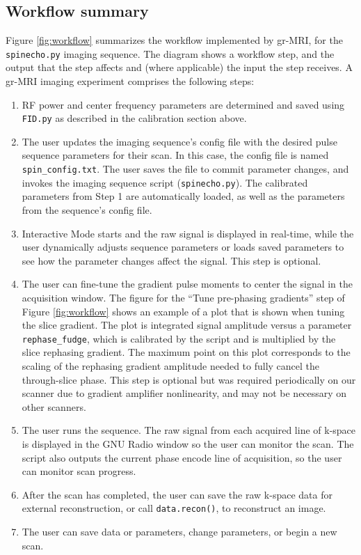\documentclass[10pt,letterpaper]{article}
\begin{document}
\subsection*{Workflow summary}
Figure \ref{fig:workflow} summarizes the workflow implemented by gr-MRI, 
for the \texttt{spinecho.py} imaging sequence.  
The diagram shows a workflow step, 
and the output that the step affects and (where applicable) the input the step receives.  
A gr-MRI imaging experiment comprises the following steps: 
\begin{enumerate}
\item RF power and center frequency parameters are determined and saved using \texttt{FID.py} as described in the calibration section above.  
\item The user updates the imaging sequence's config file with the desired pulse sequence parameters for their scan.  
In this case, the config file is named \texttt{spin\_config.txt}.  
The user saves the file to commit parameter changes,
and invokes the imaging sequence script (\texttt{spinecho.py}).  
The calibrated parameters from Step 1 are automatically loaded, as well as the parameters 
from the sequence's config file. 
\item Interactive Mode starts and the raw signal is displayed in real-time, 
while the user dynamically adjusts sequence parameters or loads saved parameters to see how the parameter changes affect the signal. 
This step is optional.
\item The user can fine-tune the gradient pulse moments 
to center the signal in the acquisition window.
The figure for the ``Tune pre-phasing gradients'' step of Figure \ref{fig:workflow} shows an example of a plot that is shown when tuning the slice gradient.
The plot is integrated signal amplitude versus 
a parameter \texttt{rephase\_fudge}, 
which is calibrated by the script and is 
multiplied by the slice rephasing gradient.
The maximum point on this plot corresponds to the scaling of the rephasing gradient amplitude needed to fully cancel the through-slice phase.
This step is optional but was required periodically on our scanner due to gradient amplifier nonlinearity, 
and may not be necessary on other scanners.
\item The user runs the sequence.
The raw signal from each acquired line of k-space is displayed in the GNU Radio window so the user can monitor the scan.  
The script also outputs the current phase encode line of acquisition, so the user can monitor scan progress.  
\item After the scan has completed, the user can save the raw k-space data for external reconstruction, 
or call \texttt{data.recon()}, to reconstruct an image.  
\item The user can save data or parameters, 
change parameters, or begin a new scan.
\end{enumerate}
\end{document}

